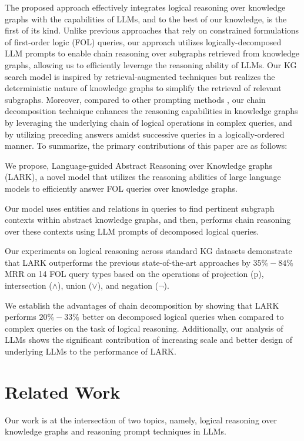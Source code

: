 \documentclass{article} %
\newcommand{\model}{LARK}
\newcommand{\fullmodel}{Language-guided Abstract Reasoning over Knowledge graphs}
\begin{document}
 The proposed approach effectively integrates logical reasoning over knowledge graphs with the capabilities of LLMs, and to the best of our knowledge, is the first of its kind. Unlike previous approaches that rely on constrained formulations of first-order logic (FOL) queries, our approach utilizes logically-decomposed LLM prompts to enable chain reasoning over subgraphs retrieved from knowledge graphs, allowing us to efficiently leverage the reasoning ability of LLMs. Our KG search model is inspired by retrieval-augmented techniques \citep{chen2022decoupling} but realizes the deterministic nature of knowledge graphs to simplify the retrieval of relevant subgraphs. Moreover, compared to other prompting methods \citep{wei2022chain,zhou2023leasttomost,khot2023decomposed}, our chain decomposition technique enhances the reasoning capabilities in knowledge graphs by leveraging the underlying chain of logical operations in complex queries, and by utilizing preceding answers amidst successive queries in a logically-ordered manner. 
 To summarize, the primary contributions of this paper are as follows:
 \begin{enumerate}[noitemsep,leftmargin=*]
 {\item We propose, {\fullmodel} ({\model}), a novel model that utilizes the reasoning abilities of large language models to efficiently answer FOL queries over knowledge graphs.
 \item Our model uses entities and relations in queries to find pertinent subgraph contexts within abstract knowledge graphs, and then, performs chain reasoning over these contexts using LLM prompts of decomposed logical queries.
 \item Our experiments on logical reasoning across standard KG datasets demonstrate that {\model} outperforms the previous state-of-the-art approaches by $35\%-84\%$ MRR on 14 FOL query types based on the operations of projection (p), intersection ($\wedge$), union ($\vee$), and negation ($\neg$).
 \item We establish the advantages of chain decomposition by showing that {\model} performs $20\%-33\%$ better on decomposed logical queries when compared to complex queries on the task of logical reasoning. Additionally, our analysis of LLMs shows the significant contribution of increasing scale and better design of underlying LLMs to the performance of {\model}.} 
 \end{enumerate}

 \section{Related Work}
\label{sec:related}
Our work is at the intersection of two topics, namely, logical reasoning over knowledge graphs and reasoning prompt techniques in LLMs.
\end{document}
